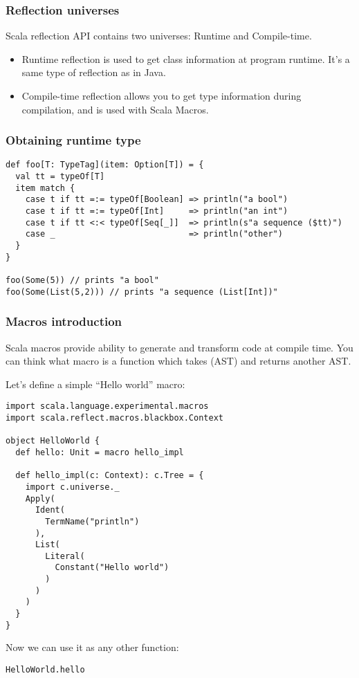 \begin{frame}[fragile]
\frametitle{Reflection universes}
Scala reflection API contains two universes: Runtime and Compile-time.

\begin{itemize}
\item Runtime reflection is used to get class information at program runtime. It's a same type of reflection as in Java.
\item Compile-time reflection allows you to get type information during compilation, and is used with Scala Macros.
\end{itemize}
\end{frame}

\begin{frame}[fragile]
\frametitle{Obtaining runtime type}
\begin{lstlisting}
def foo[T: TypeTag](item: Option[T]) = {
  val tt = typeOf[T]
  item match {
    case t if tt =:= typeOf[Boolean] => println("a bool")
    case t if tt =:= typeOf[Int]     => println("an int")
    case t if tt <:< typeOf[Seq[_]]  => println(s"a sequence ($tt)")
    case _                           => println("other")
  }
}

foo(Some(5)) // prints "a bool"
foo(Some(List(5,2))) // prints "a sequence (List[Int])"
\end{lstlisting}
\end{frame}

\begin{frame}[fragile]
\frametitle{Macros introduction}
Scala macros provide ability to generate and transform code at compile time.  You can think what macro is a function which
takes  (AST) and returns another AST.

Let's define a simple ``Hello world'' macro:

\begin{lstlisting}
import scala.language.experimental.macros
import scala.reflect.macros.blackbox.Context

object HelloWorld {
  def hello: Unit = macro hello_impl

  def hello_impl(c: Context): c.Tree = {
    import c.universe._
    Apply(
      Ident(
        TermName("println")
      ),
      List(
        Literal(
          Constant("Hello world")
        )
      )
    )
  }
}
\end{lstlisting}

Now we can use it as any other function:

\begin{lstlisting}
HelloWorld.hello
\end{lstlisting}

\end{frame}

